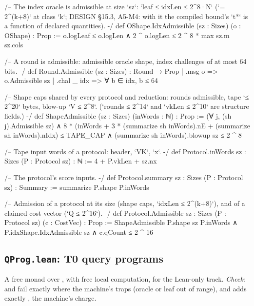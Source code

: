 \begin{leancode}[fontsize=\scriptsize,label={\footnotesize Contract/Cost.lean}]
/-- The index oracle is admissible at size `sz`: `leaf ≤ idxLen ≤ 2^8·N` (`= 2^(k+8)` at class `k`;
DESIGN §15.3, A5-M4: with it the compiled bound's `t*` is a function of declared quantities). -/
def OShape.IdxAdmissible (sz : Sizes) (o : OShape) : Prop :=
  o.logLeaf ≤ o.logLen ∧ 2 ^ o.logLen ≤ 2 ^ 8 * max sz.m sz.cols

/-- A round is admissible: admissible oracle shape, index challenges of at most 64 bits. -/
def Round.Admissible (sz : Sizes) : Round → Prop
  | .msg o => o.Admissible sz
  | .chal _ idx => ∀ b ∈ idx, b ≤ 64

/-- Shape caps shared by every protocol and reduction: rounds admissible, tape `≤ 2^20` bytes,
blow-up `V ≤ 2^8`. (`rounds ≤ 2^14` and `vkLen ≤ 2^10` are structure fields.) -/
def ShapeAdmissible (sz : Sizes) (inWords : ℕ) : Prop :=
  (∀ j, (sh j).Admissible sz) ∧ 8 * (inWords + 3 * (summarize sh inWords).nE + (summarize sh inWords).nIdx) ≤
      TAPE_CAP ∧
    (summarize sh inWords).blowup sz ≤ 2 ^ 8

/-- Tape input words of a protocol: header, `VK`, `x`. -/
def Protocol.inWords {sz : Sizes} (P : Protocol sz) : ℕ := 4 + P.vkLen + sz.nx

/-- The protocol's score inputs. -/
def Protocol.summary {sz : Sizes} (P : Protocol sz) : Summary := summarize P.shape P.inWords

/-- Admission of a protocol at its size (shape caps, `idxLen ≤ 2^(k+8)`), and of a claimed cost
vector (`Q ≤ 2^16`). -/
def Protocol.Admissible {sz : Sizes} (P : Protocol sz) (c : CostVec) : Prop :=
  ShapeAdmissible P.shape sz P.inWords ∧ P.idxShape.IdxAdmissible sz ∧ c.qCount ≤ 2 ^ 16
\end{leancode}

\subsection{\texttt{QProg.lean}: T0 query programs}

A free monad over , with free local computation, for the Lean-only track.
\emph{Check}:  and  fail exactly where the machine's  traps
(oracle or leaf out of range), and  adds exactly , the machine's
charge.

